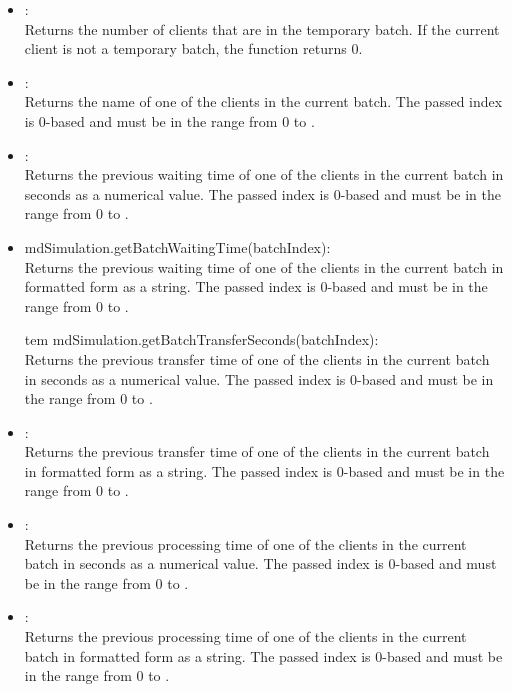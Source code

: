 \begin{itemize}
\item
{}:\\
Returns the number of clients that are in the temporary batch.  
If the current client is not a temporary batch, the function returns 0.

\item
{}:\\
Returns the name of one of the clients in the current batch.
The passed index is 0-based and must be in the range from 0 to .

\item
{}:\\
Returns the previous waiting time of one of the clients in the current batch in seconds as a numerical value.
The passed index is 0-based and must be in the range from 0 to .


\item
md{Simulation.getBatchWaitingTime(batchIndex)}:\\
Returns the previous waiting time of one of the clients in the current batch in formatted form as a string.
The passed index is 0-based and must be in the range from 0 to .


tem
md{Simulation.getBatchTransferSeconds(batchIndex)}:\\
Returns the previous transfer time of one of the clients in the current batch in seconds as a numerical value.
The passed index is 0-based and must be in the range from 0 to .


\item
{}:\\
Returns the previous transfer time of one of the clients in the current batch in formatted form as a string.
The passed index is 0-based and must be in the range from 0 to .

\item
{}:\\
Returns the previous processing time of one of the clients in the current batch in seconds as a numerical value.
The passed index is 0-based and must be in the range from 0 to .

\item
{}:\\
Returns the previous processing time of one of the clients in the current batch in formatted form as a string.
The passed index is 0-based and must be in the range from 0 to .
	 

\end{itemize}
